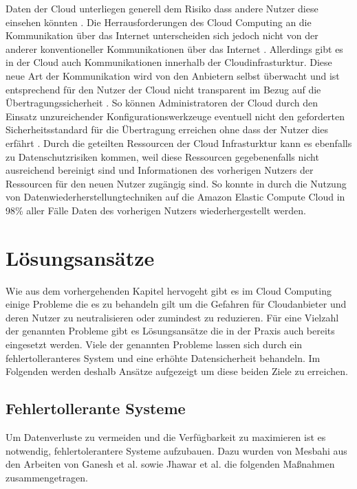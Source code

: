 Daten der Cloud unterliegen generell dem Risiko dass andere Nutzer diese einsehen könnten \cite{ali2015}. 
Die Herrausforderungen des Cloud Computing an die Kommunikation über das Internet unterscheiden sich jedoch nicht von der anderer konventioneller Kommunikationen über das Internet \cite{ali2015}. 
Allerdings gibt es in der Cloud auch Kommunikationen innerhalb der Cloudinfrasturktur. Diese neue Art der Kommunikation wird von den Anbietern selbst überwacht und ist entsprechend für den Nutzer der Cloud nicht transparent im Bezug auf die Übertragungssicherheit \cite{ali2015}. 
So können Administratoren der Cloud durch den Einsatz unzureichender Konfigurationswerkzeuge eventuell nicht den geforderten Sicherheitsstandard für die Übertragung erreichen ohne dass der Nutzer dies erfährt \cite{dinh2013}.
Durch die geteilten Ressourcen der Cloud Infrasturktur kann es ebenfalls zu Datenschutzrisiken kommen, weil diese Ressourcen gegebenenfalls nicht ausreichend bereinigt sind und Informationen des vorherigen Nutzers der Ressourcen für den neuen Nutzer zugängig sind. So konnte in \cite{balduzzi2012} durch die Nutzung von Datenwiederherstellungtechniken auf die Amazon Elastic Compute Cloud in 98\% aller Fälle Daten des vorherigen Nutzers wiederhergestellt werden. 

\section{Lösungsansätze}
Wie aus dem vorhergehenden Kapitel hervogeht gibt es im Cloud Computing einige Probleme die es zu behandeln gilt um die Gefahren für Cloudanbieter und deren Nutzer zu neutralisieren oder zumindest zu reduzieren. 
Für eine Vielzahl der genannten Probleme gibt es Lösungsansätze die in der Praxis auch bereits eingesetzt werden. 
Viele der genannten Probleme lassen sich durch ein fehlertolleranteres System und eine erhöhte Datensicherheit behandeln. Im Folgenden werden deshalb Ansätze aufgezeigt um diese beiden Ziele zu erreichen.

\subsection{Fehlertollerante Systeme}
Um Datenverluste zu vermeiden und die Verfügbarkeit zu maximieren ist es notwendig, fehlertolerantere Systeme aufzubauen. Dazu wurden von Mesbahi \cite{mesbahi2018} aus den Arbeiten von Ganesh et al. \cite{ganesh2014} sowie Jhawar et al. \cite{jhawar2013} die folgenden Maßnahmen zusammengetragen.

